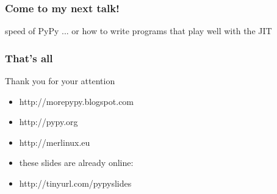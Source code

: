\documentclass[utf8x, 14pt]{beamer}
\begin{document}
\begin{frame}
  \frametitle{Come to my next talk!}
  \begin{block}{speed of PyPy}
    ... or how to write programs that play well with the JIT
  \end{block}
\end{frame}

\begin{frame}
  \frametitle{That's all}
  Thank you for your attention
  \begin{itemize}
    \item http://morepypy.blogspot.com
    \item http://pypy.org
    \item http://merlinux.eu
    \item these slides are already online:
    \item http://tinyurl.com/pypyslides
  \end{itemize}
\end{frame}
\end{document}
